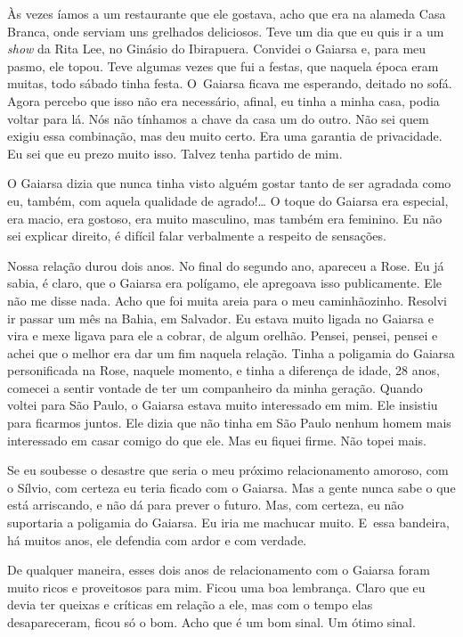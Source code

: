 Às vezes íamos a um restaurante que ele gostava, acho que era na alameda
Casa Branca, onde serviam uns grelhados deliciosos. Teve um dia que eu
quis ir a um \emph{show} da Rita Lee, no Ginásio do Ibirapuera. Convidei
o Gaiarsa e, para meu pasmo, ele topou. Teve algumas vezes que fui a
festas, que naquela época eram muitas, todo sábado tinha festa. O~Gaiarsa ficava me esperando, deitado no sofá. Agora percebo que isso não
era necessário, afinal, eu tinha a minha casa, podia voltar para lá. Nós
não tínhamos a chave da casa um do outro. Não sei quem exigiu essa
combinação, mas deu muito certo. Era uma garantia de privacidade. Eu sei
que eu prezo muito isso. Talvez tenha partido de mim.

O Gaiarsa dizia que nunca tinha visto alguém gostar tanto de ser
agradada como eu, também, com aquela qualidade de agrado!… O
toque do Gaiarsa era especial, era macio, era gostoso, era muito
masculino, mas também era feminino. Eu não sei explicar direito, é
difícil falar verbalmente a respeito de sensações.

Nossa relação durou dois anos. No final do segundo ano, apareceu a Rose.
Eu já sabia, é claro, que o Gaiarsa era polígamo, ele apregoava isso
publicamente. Ele não me disse nada. Acho que foi muita areia para o meu
caminhãozinho. Resolvi ir passar um mês na Bahia, em Salvador. Eu estava
muito ligada no Gaiarsa e vira e mexe ligava para ele a cobrar, de algum
orelhão. Pensei, pensei, pensei e achei que o melhor era dar um fim
naquela relação. Tinha a poligamia do Gaiarsa personificada na Rose,
naquele momento, e tinha a diferença de idade, 28 anos, comecei a sentir
vontade de ter um companheiro da minha geração. Quando voltei para São
Paulo, o Gaiarsa estava muito interessado em mim. Ele insistiu para
ficarmos juntos. Ele dizia que não tinha em São Paulo nenhum homem mais
interessado em casar comigo do que ele. Mas eu fiquei firme. Não topei
mais.

Se eu soubesse o desastre que seria o meu próximo relacionamento
amoroso, com o Sílvio, com certeza eu teria ficado com o Gaiarsa. Mas a
gente nunca sabe o que está arriscando, e não dá para prever o futuro.
Mas, com certeza, eu não suportaria a poligamia do Gaiarsa. Eu iria me
machucar muito. E~essa bandeira, há muitos anos, ele defendia com ardor
e com verdade.

De qualquer maneira, esses dois anos de relacionamento com o Gaiarsa
foram muito ricos e proveitosos para mim. Ficou uma boa lembrança. Claro
que eu devia ter queixas e críticas em relação a ele, mas com o tempo
elas desapareceram, ficou só o bom. Acho que é um bom sinal. Um ótimo
sinal.

